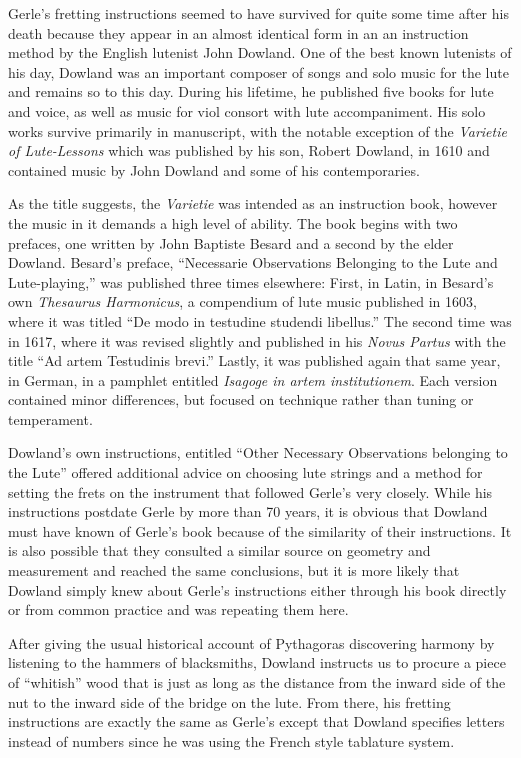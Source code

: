 Gerle's fretting instructions seemed to have survived for quite some time after his
death because they appear in an almost identical form in an an instruction method
by the English lutenist John Dowland. One of the best known lutenists of his day,
Dowland was an important composer of songs and solo music for the lute and remains so
to this day. During his lifetime, he published five books for lute and voice, as well
as music for viol consort with lute accompaniment.  His solo works survive primarily in
manuscript, with the notable exception of the \textit{Varietie of Lute-Lessons} which was
published by his son, Robert Dowland, in 1610 and contained music by John Dowland and
some of his contemporaries.

As the title suggests, the \textit{Varietie} was intended as an instruction book, however the music
in it demands a high level of ability.  The book begins with two prefaces, one written by John
Baptiste Besard and a second by the elder Dowland. Besard's preface, ``Necessarie Observations
Belonging to the Lute and Lute-playing,'' was published three times elsewhere: First, in Latin, in
Besard's own \textit{Thesaurus Harmonicus}, a compendium of lute music published in 1603, 
where it was titled ``De modo in testudine studendi libellus.''  The second time was in 1617,
where it was revised slightly and published in his \textit{Novus Partus} with the title ``Ad artem Testudinis brevi.''
Lastly, it was published again that same year, in German, in a pamphlet entitled \textit{Isagoge in artem institutionem}.
Each version contained minor differences, but focused on technique rather than tuning or temperament.

Dowland's own instructions, entitled ``Other Necessary Observations belonging to the
Lute'' offered additional advice on choosing lute strings and a method for setting the frets on the
instrument that followed Gerle's very closely. While his instructions postdate Gerle by more than 70
years, it is obvious that Dowland must have known of Gerle's book because of the similarity of their
instructions.  It is also possible that they consulted a similar source on geometry and measurement
and reached the same conclusions, but it is more likely that Dowland simply knew about Gerle's
instructions either through his book directly or from common practice and was repeating them here.

After giving the usual historical account of Pythagoras discovering harmony by
listening to the hammers of blacksmiths, Dowland instructs us to procure a piece
of ``whitish'' wood that is just as long as the distance from the inward
side of the nut to the inward side of the bridge on the lute.  From there, his
fretting instructions are exactly the same as Gerle's except that
Dowland specifies letters instead of numbers since he was using the French style
tablature system.

